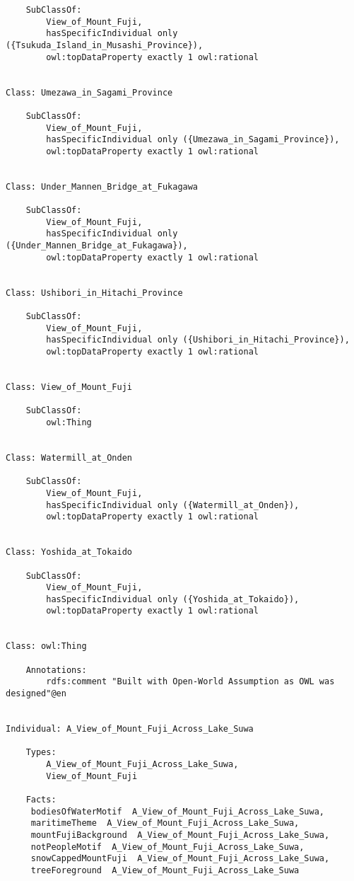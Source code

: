\documentclass[titlepage,a4paper,12pt,oneside]{book}
\begin{document}
\begin{appendices}
\begin{lstlisting}
    SubClassOf: 
        View_of_Mount_Fuji,
        hasSpecificIndividual only ({Tsukuda_Island_in_Musashi_Province}),
        owl:topDataProperty exactly 1 owl:rational
    
    
Class: Umezawa_in_Sagami_Province

    SubClassOf: 
        View_of_Mount_Fuji,
        hasSpecificIndividual only ({Umezawa_in_Sagami_Province}),
        owl:topDataProperty exactly 1 owl:rational
    
    
Class: Under_Mannen_Bridge_at_Fukagawa

    SubClassOf: 
        View_of_Mount_Fuji,
        hasSpecificIndividual only ({Under_Mannen_Bridge_at_Fukagawa}),
        owl:topDataProperty exactly 1 owl:rational
    
    
Class: Ushibori_in_Hitachi_Province

    SubClassOf: 
        View_of_Mount_Fuji,
        hasSpecificIndividual only ({Ushibori_in_Hitachi_Province}),
        owl:topDataProperty exactly 1 owl:rational
    
    
Class: View_of_Mount_Fuji

    SubClassOf: 
        owl:Thing
    
    
Class: Watermill_at_Onden

    SubClassOf: 
        View_of_Mount_Fuji,
        hasSpecificIndividual only ({Watermill_at_Onden}),
        owl:topDataProperty exactly 1 owl:rational
    
    
Class: Yoshida_at_Tokaido

    SubClassOf: 
        View_of_Mount_Fuji,
        hasSpecificIndividual only ({Yoshida_at_Tokaido}),
        owl:topDataProperty exactly 1 owl:rational
    
    
Class: owl:Thing

    Annotations: 
        rdfs:comment "Built with Open-World Assumption as OWL was designed"@en
    
    
Individual: A_View_of_Mount_Fuji_Across_Lake_Suwa

    Types: 
        A_View_of_Mount_Fuji_Across_Lake_Suwa,
        View_of_Mount_Fuji
    
    Facts:  
     bodiesOfWaterMotif  A_View_of_Mount_Fuji_Across_Lake_Suwa,
     maritimeTheme  A_View_of_Mount_Fuji_Across_Lake_Suwa,
     mountFujiBackground  A_View_of_Mount_Fuji_Across_Lake_Suwa,
     notPeopleMotif  A_View_of_Mount_Fuji_Across_Lake_Suwa,
     snowCappedMountFuji  A_View_of_Mount_Fuji_Across_Lake_Suwa,
     treeForeground  A_View_of_Mount_Fuji_Across_Lake_Suwa
    

\end{lstlisting}
\end{appendices}
\end{document}
